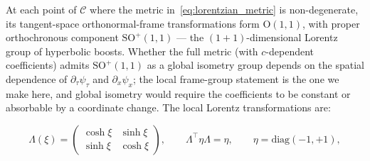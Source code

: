 \documentclass[11pt]{article}
\begin{document}
At each point of $\mathcal{C}$ where the metric in~\eqref{eq:lorentzian_metric} is non-degenerate, its tangent-space orthonormal-frame transformations form $\mathrm{O}(1,1)$, with proper orthochronous component $\mathrm{SO}^+(1,1)$ — the $(1{+}1)$-dimensional Lorentz group of hyperbolic boosts. Whether the full metric (with $c$-dependent coefficients) admits $\mathrm{SO}^+(1,1)$ as a global isometry group depends on the spatial dependence of $\partial_\tau\psi_\tau$ and $\partial_x\psi_x$; the local frame-group statement is the one we make here, and global isometry would require the coefficients to be constant or absorbable by a coordinate change. The local Lorentz transformations are:

\begin{equation}
\Lambda(\xi) = \begin{pmatrix} \cosh\xi & \sinh\xi \\ \sinh\xi & \cosh\xi \end{pmatrix}, \qquad \Lambda^\top \eta\Lambda = \eta, \qquad \eta = \mathrm{diag}(-1, +1),
\end{equation}
\end{document}
